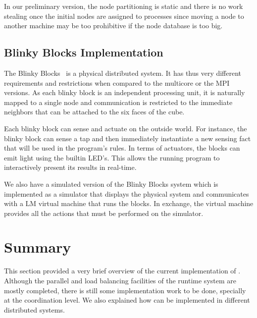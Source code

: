 In our preliminary version, the node partitioning is static and there is no work stealing once the initial nodes are assigned to processes since
moving a node to another machine may be too prohibitive if the node database is too big.
 
\subsection{Blinky Blocks Implementation}

The Blinky Blocks~\cite{Kirby-chi11} is a physical distributed system. It has thus very different requirements and restrictions when compared to the multicore
or the MPI versions. As each blinky block is an independent processing unit, it is naturally mapped to a single node and communication is restricted
to the immediate neighbors that can be attached to the six faces of the cube.

Each blinky block can sense and actuate on the outside world. For instance, the blinky block can sense a tap and then immediately instantiate
a new sensing fact that will be used in the program's rules. In terms of actuators, the blocks can emit light using the builtin LED's.
This allows the running program to interactively present its results in real-time.

We also have a simulated version of the Blinky Blocks system which is implemented as a simulator that displays the physical system and
communicates with a LM virtual machine that runs the blocks. In exchange, the virtual machine provides all the actions that must be performed
on the simulator.

\section{Summary}

This section provided a very brief overview of the current implementation of \lang. Although the parallel and load balancing facilities of the
runtime system are mostly completed, there is still some implementation work to be done, specially at the coordination level.
We also explained how \lang can be implemented in different distributed systems.
